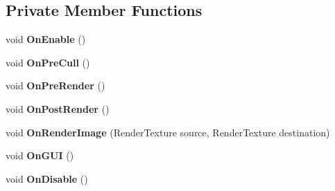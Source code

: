 \subsection*{Private Member Functions}
\begin{DoxyCompactItemize}
\item 
\mbox{\label{class_unity_engine_1_1_post_processing_1_1_post_processing_behaviour_a8d7a6197915a1920305fd099094eb30f}} 
void {\bfseries On\+Enable} ()
\item 
\mbox{\label{class_unity_engine_1_1_post_processing_1_1_post_processing_behaviour_a0133b1e4048698bfc2bd3a1061318f18}} 
void {\bfseries On\+Pre\+Cull} ()
\item 
\mbox{\label{class_unity_engine_1_1_post_processing_1_1_post_processing_behaviour_a6a4e3b048d0285d3474b1cb054bdb451}} 
void {\bfseries On\+Pre\+Render} ()
\item 
\mbox{\label{class_unity_engine_1_1_post_processing_1_1_post_processing_behaviour_aa8c253050704f427694b6598ae6b4c2f}} 
void {\bfseries On\+Post\+Render} ()
\item 
\mbox{\label{class_unity_engine_1_1_post_processing_1_1_post_processing_behaviour_ace9285947348e24fb9e15005eba7819e}} 
void {\bfseries On\+Render\+Image} (Render\+Texture source, Render\+Texture destination)
\item 
\mbox{\label{class_unity_engine_1_1_post_processing_1_1_post_processing_behaviour_a5953c6d2c781844a766b4a29611c7ce4}} 
void {\bfseries On\+G\+UI} ()
\item 
\mbox{\label{class_unity_engine_1_1_post_processing_1_1_post_processing_behaviour_a426de5a098539878692c8c4f20af00e6}} 
void {\bfseries On\+Disable} ()
\item 
\mbox{\label{class_unity_engine_1_1_post_processing_1_1_post_processing_behaviour_a8120aef0a42aeb78208fc706da9ce891}} 

\end{DoxyCompactItemize}
